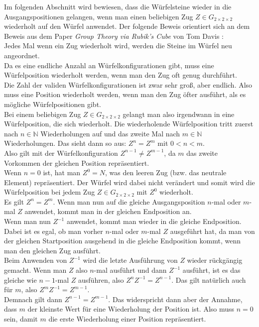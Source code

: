 \documentclass[12pt,a4paper, usenames, dvipsnames]{article}
\newcommand{\Gtwo}{\ensuremath{G_{2\times 2\times 2}}}
\begin{document}
Im folgenden Abschnitt wird bewiesen, dass die Würfelsteine wieder in die Ausgangspositionen gelangen, wenn man einen beliebigen Zug $Z \in \Gtwo$ wiederholt auf den Würfel anwendet.
Der folgende Beweis orientiert sich an dem Beweis aus dem Paper \textit{Group Theory via Rubik's Cube} von Tom Davis \cite{TD}: \\
Jedes Mal wenn ein Zug wiederholt wird, werden die Steine im Würfel neu angeordnet. \\ 
Da es eine endliche Anzahl an Würfelkonfigurationen gibt, muss eine Würfelposition wiederholt werden, wenn man den Zug oft genug durchführt. \\
Die Zahl der validen Würfelkonfigurationen ist zwar sehr groß, aber endlich. Also muss eine Position wiederholt werden, wenn man den Zug öfter ausführt, als es mögliche Würfelpositionen gibt. \\
Bei einem beliebigen Zug $Z \in \Gtwo$ gelangt man also irgendwann in eine Würfelposition, die sich wiederholt. Die wiederholende Würfelposition tritt zuerst nach $n \in \mathbb{N}$ Wiederholungen auf und das zweite Mal nach $m \in \mathbb{N}$ Wiederholungen. Das sieht dann so aus: $Z^n=Z^m$ mit $0 < n < m$. \\
Also gilt mit der Würfelkonfiguration $Z^{n-1} \neq Z^{m-1}$, da $m$ das zweite Vorkommen der gleichen Position repräsentiert. \\
Wenn $n=0$ ist, hat man $Z^0=N$, was den leeren Zug (bzw. das neutrale Element) repräsentiert. Der Würfel wird dabei nicht verändert und somit wird die Würfelposition bei jedem Zug $Z \in \Gtwo$ mit $Z^0$ wiederholt. \\
Es gilt $Z^n = Z^m$. Wenn man nun auf die gleiche Ausgangsposition $n$-mal oder $m$-mal $Z$ anwendet, kommt man in der gleichen Endposition an. \\
Wenn man nun $Z^{-1}$ anwendet, kommt man wieder in die gleiche Endposition. Dabei ist es egal, ob man vorher $n$-mal oder $m$-mal $Z$ ausgeführt hat, da man von der gleichen Startposition ausgehend in die gleiche Endposition kommt, wenn man den gleichen Zug ausführt. \\
Beim Anwenden von $Z^{-1}$ wird die letzte Ausführung von $Z$ wieder rückgängig gemacht. Wenn man $Z$ also $n$-mal ausführt und dann $Z^{-1}$ ausführt, ist es das gleiche wie $n-1$-mal $Z$ ausführen, also $Z^nZ^{-1}=Z^{n-1}$. Das gilt natürlich auch für $m$, also $Z^mZ^{-1}=Z^{m-1}$.\\
Demnach gilt dann $Z^{n-1}=Z^{m-1}$. Das widerspricht dann aber der Annahme, dass $m$ der kleinste Wert für eine Wiederholung der Position ist. Also muss $n=0$ sein, damit $m$ die erste Wiederholung einer Position repräsentiert. 
\end{document}
